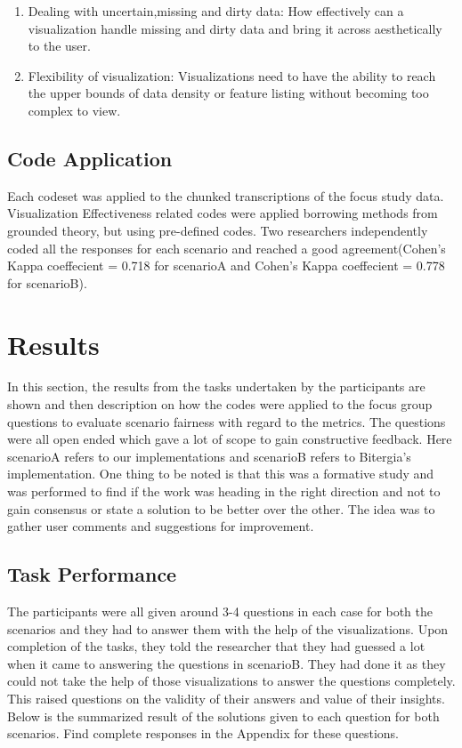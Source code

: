 \documentclass[seploa]{beavtex}
\begin{document}
\begin{enumerate}
\item Dealing with uncertain,missing and dirty data: How effectively can a visualization handle missing and dirty data and bring it across aesthetically to the user\cite{grins2001}.

\item Flexibility of visualization: Visualizations need to have the ability to reach the upper bounds of data density or feature listing without becoming too complex to view\cite{grins2001}.
\end{enumerate}

\section{Code Application}
Each codeset was applied to the chunked transcriptions of the focus study data. Visualization Effectiveness related  codes  were  applied borrowing methods from  grounded theory\cite{corbin2008}, but using pre-­defined codes. Two researchers independently coded all the responses for each scenario and reached a good agreement(Cohen’s  Kappa  coeffecient  =  0.718 for scenarioA and Cohen’s  Kappa  coeffecient  =  0.778 for scenarioB).

\chapter{Results}
In this section, the results from the tasks undertaken by the participants are shown and then description on how the codes were applied to the focus group questions to evaluate scenario fairness with regard to the metrics. The questions were all open ended which gave a lot of scope to gain constructive feedback. Here scenarioA refers to our implementations and scenarioB refers to Bitergia's implementation. One thing to be noted is that this was a formative study and was performed to find if the work was heading in the right direction and not to gain consensus or state a solution to be better over the other. The idea was to gather user comments and suggestions for improvement.

\section{Task Performance}
The participants were all given around 3-4 questions in each case for both the scenarios and they had to answer them with the help of the visualizations. Upon completion of the tasks, they told the researcher that they had guessed a lot when it came to answering the questions in scenarioB. They had done it as they could not take the help of those visualizations to answer the questions completely. This raised questions on the validity of their answers and value of their insights. Below is the summarized result of the solutions given to each question for both scenarios. Find complete responses in the Appendix for these questions.
\end{document}
